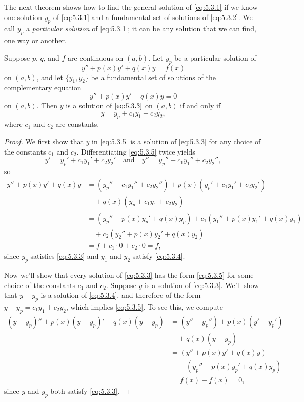 The next theorem shows how to find the general solution of
\eqref{eq:5.3.1} if we know one solution $y_p$ of \eqref{eq:5.3.1} and a
fundamental set of solutions of \eqref{eq:5.3.2}. We call
$y_p$ a
\emph{\color{blue}particular solution}
of \eqref{eq:5.3.1}; it can be any solution that we can find, one way or another.

\begin{theorem}\label{thmtype:5.3.2}
Suppose $p$, $q$, and $f$ are continuous on $(a,b)$. Let $y_p$
be a particular solution of
\begin{equation} \label{eq:5.3.3}
y''+p(x)y'+q(x)y=f(x)
\end{equation}
on $(a,b)$, and let  $\{y_1,y_2\}$ be a fundamental set of solutions
of the complementary equation
\begin{equation} \label{eq:5.3.4}
y''+p(x)y'+q(x)y=0
\end{equation}
on $(a,b)$.
Then $y$ is a solution of  $\eqref{eq:5.3.3}$ on $(a,b)$ if and  only if
\begin{equation} \label{eq:5.3.5}
y=y_p+c_1y_1+c_2y_2,
\end{equation}
where $c_1$ and $c_2$  are constants.
\end{theorem}

\begin{proof}
We first show that $y$ in \eqref{eq:5.3.5} is a solution of
\eqref{eq:5.3.3} for any choice of the constants $c_1$ and $c_2$.
Differentiating \eqref{eq:5.3.5} twice yields
\[
y'=y_p'+c_1y_1'+c_2y_2'\quad\text{and}\quad
y''=y_p''+ c_1y_1''+c_2y_2'',
\]
so
\begin{align*}
y''+p(x)y'+q(x)y&=(y_p''+c_1y_1''+c_2y_2'')
+p(x)(y_p'+c_1y_1'+c_2y_2')\\
&\quad{}+q(x)(y_p+c_1y_1+c_2y_2)\\
&=(y_p''+p(x)y_p'+q(x)y_p)+c_1(y_1''+p(x)y_1'+q(x)y_1)\\
&\quad{}+c_2(y_2''+p(x)y_2'+q(x)y_2)\\
&= f+c_1\cdot0+c_2\cdot0=f,
\end{align*}
since $y_p$ satisfies \eqref{eq:5.3.3} and $y_1$ and $y_2$ satisfy
\eqref{eq:5.3.4}.

Now we'll show that every solution of \eqref{eq:5.3.3} has the form
\eqref{eq:5.3.5} for some choice of the constants $c_1$ and  $c_2$.
Suppose $y$ is a solution of \eqref{eq:5.3.3}. We'll show that
$y-y_p$ is a solution of \eqref{eq:5.3.4}, and therefore of the form
$y-y_p=c_1y_1+c_2y_2$, which implies \eqref{eq:5.3.5}. To see this, we
compute
\begin{align*}
(y-y_p)''+p(x)(y-y_p)'+q(x)(y-y_p)
&=(y''-y_p'')+p(x)(y'-y_p')\\
&\quad{}+q(x)(y-y_p)\\
&=(y''+p(x)y'+q(x)y)\\
&\quad{}-(y_p''+p(x)y_p'+q(x)y_p)\\
&=f(x)-f(x)=0,
\end{align*}
since $y$ and $y_p$ both satisfy \eqref{eq:5.3.3}.
\end{proof}

